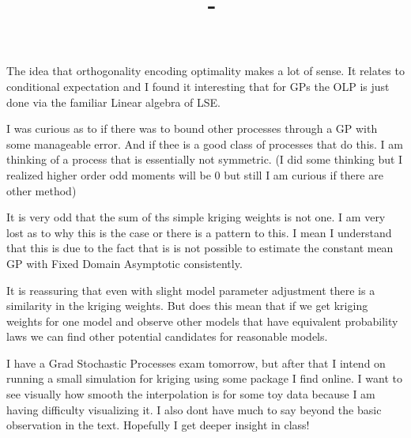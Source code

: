 \documentclass[answers,12pt,addpoints]{exam}
\author{\name}
\title{\course \ - \assignment}
\begin{document}
\maketitle

\newpage
\begin{questions}
\question The idea that orthogonality encoding optimality makes a lot of sense. It relates to conditional expectation and I found it interesting that for GPs the OLP is just done via the familiar Linear algebra of LSE.

I was curious as to if there was to bound other processes through a GP with some manageable error. And if thee is a good class of processes that do this. I am thinking of a process that is essentially not symmetric. (I did some thinking but I realized higher order odd moments will be 0 but still I am curious if there are other method)

\question It is very odd that the sum of ths simple kriging weights is not one. I am very lost as to why this is the case or there is a pattern to this. I mean I understand that this is due to the fact that is is not possible to estimate the constant mean GP with Fixed Domain Asymptotic consistently. 

\question It is reassuring that even with slight model parameter adjustment there is a similarity in the kriging weights. But does this mean that if we get kriging weights for one model and observe other models that have equivalent probability laws we can find other potential candidates for reasonable models. 

\question I have a Grad Stochastic Processes exam tomorrow, but after that I intend on running a small simulation for kriging using some package I find online. I want to see visually how smooth the interpolation is for some toy data because I am having difficulty visualizing it. I also dont have much to say beyond the basic observation in the text. Hopefully I get deeper insight in class!

\end{questions}
\end{document}
